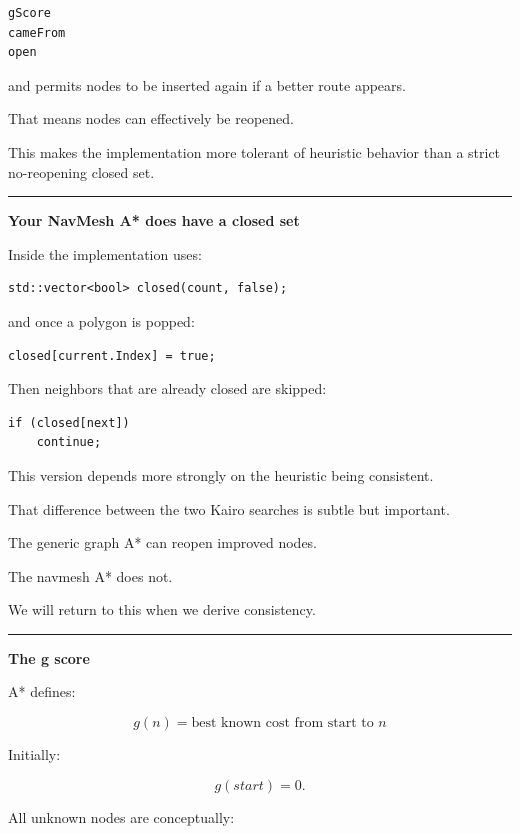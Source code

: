 \begin{verbatim}
gScore
cameFrom
open
\end{verbatim}

and permits nodes to be inserted again if a better route appears.

That means nodes can effectively be reopened.

This makes the implementation more tolerant of heuristic behavior than a strict no-reopening closed set.

\begin{center}\rule{0.5\linewidth}{0.5pt}\end{center}

\textbf{Your NavMesh A* does have a closed set}

Inside  the implementation uses:

\begin{verbatim}
std::vector<bool> closed(count, false);
\end{verbatim}

and once a polygon is popped:

\begin{verbatim}
closed[current.Index] = true;
\end{verbatim}

Then neighbors that are already closed are skipped:

\begin{verbatim}
if (closed[next])
    continue;
\end{verbatim}

This version depends more strongly on the heuristic being consistent.

That difference between the two Kairo searches is subtle but important.

The generic graph A* can reopen improved nodes.

The navmesh A* does not.

We will return to this when we derive consistency.

\begin{center}\rule{0.5\linewidth}{0.5pt}\end{center}

\textbf{The g score}

A* defines:

\[
\boxed{
g(n)
=
\text{best known cost from start to }n
}
\]

Initially:

\[
g(start)=0.
\]

All unknown nodes are conceptually:

